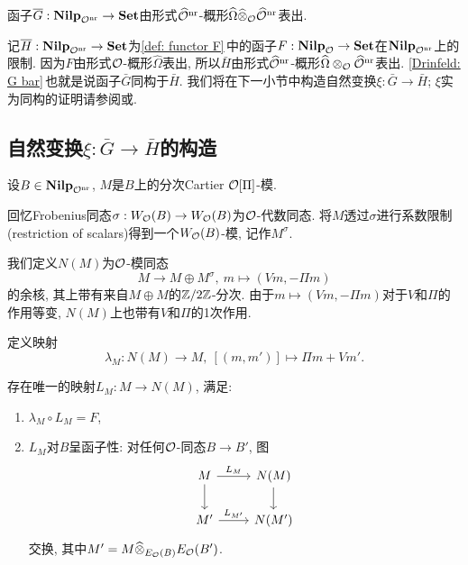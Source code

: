 \begin{theorem}[Drinfeld]\label{Drinfeld: G bar}
    函子$\overline{G} : \mathbf{Nilp}_{\mathcal{O}^{\mathrm{nr}}}\to\mathbf{Set}$由形式$\widehat{\mathcal{O}}^{\mathrm{nr}}$-概形$\widehat{\Omega}\widehat{\otimes}_{\mathcal{O}}\widehat{\mathcal{O}}^{\mathrm{nr}}$表出.
\end{theorem}

记$\overline{H} : \mathbf{Nilp}_{\mathcal{O}^{\mathrm{nr}}}\to \mathbf{Set}$为\cref{def: functor F}\,中的函子$F : \mathbf{Nilp}_{\mathcal{O}}\to\mathbf{Set}$在$\mathbf{Nilp}_{\mathcal{O}^{\mathrm{nr}}}$上的限制.
因为$F$由形式$\mathcal{O}$-概形$\hat{\Omega}$表出, 所以$\bar{H}$由形式$\widehat{\mathcal{O}}^{\mathrm{nr}}$-概形$\widehat{\Omega}\otimes_{\mathcal{O}}\widehat{\mathcal{O}}^{\mathrm{nr}}$表出.
\cref{Drinfeld: G bar}\,也就是说函子$\bar{G}$同构于$\bar{H}$.
我们将在下一小节中构造自然变换$\xi : \bar{G}\to\bar{H}$; $\xi$实为同构的证明请参阅\cite{BC91}或\cite{drinfel1976coverings}.
\subsection{自然变换$\xi : \bar{G}\to\bar{H}$的构造}

设$B\in\mathbf{Nilp}_{\mathcal{O}^{\mathrm{nr}}}$, $M$是$B$上的分次Cartier $\mathcal{O}[\Pi]$-模.

回忆Frobenius同态$\sigma : W_{\mathcal{O}}(B)\to W_{\mathcal{O}}(B)$为$\mathcal{O}$-代数同态.
将$M$透过$\sigma$进行系数限制(restriction of scalars)得到一个$W_{\mathcal{O}}(B)$-模, 记作$M^\sigma$.

我们定义$N(M)$为$\mathcal{O}$-模同态\[M\to M\oplus M^\sigma,\ m\mapsto (Vm, -\Pi m)\]的余核,
其上带有来自$M\oplus M$的$\mathbb{Z}/2\mathbb{Z}$-分次.
由于$m\mapsto (Vm, -\Pi m)$对于$V$和$\Pi$的作用等变,
$N(M)$上也带有$V$和$\Pi$的1次作用.

定义映射\[\lambda_M : N(M)\to M,\ [(m, m')]\mapsto \Pi m + Vm'.\]
\begin{proposition}
    存在唯一的映射$L_M : M\to N(M)$, 满足:\begin{enumerate}
        \item $\lambda_M\circ L_M = F$,
        \item $L_M$对$B$呈函子性: 对任何$\mathcal{O}$-同态$B\to B'$, 图\[%
        \begin{tikzcd}
        M \arrow[r, "L_M"] \arrow[d] & N(M) \arrow[d] \\
        M' \arrow[r, "L_{M'}"]          & N(M')         
        \end{tikzcd}\]交换, 其中$M' = M\widehat{\otimes}_{E_{\mathcal{O}}(B)} E_{\mathcal{O}}(B')$.
    \end{enumerate}
\end{proposition}

